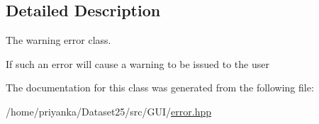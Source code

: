 \subsection{\-Detailed \-Description}
\-The warning error class. 

\-If such an error will cause a warning to be issued to the user 

\-The documentation for this class was generated from the following file\-:\begin{DoxyCompactItemize}
\item 
/home/priyanka/\-Dataset25/src/\-G\-U\-I/\hyperlink{error_8hpp}{error.\-hpp}\end{DoxyCompactItemize}

